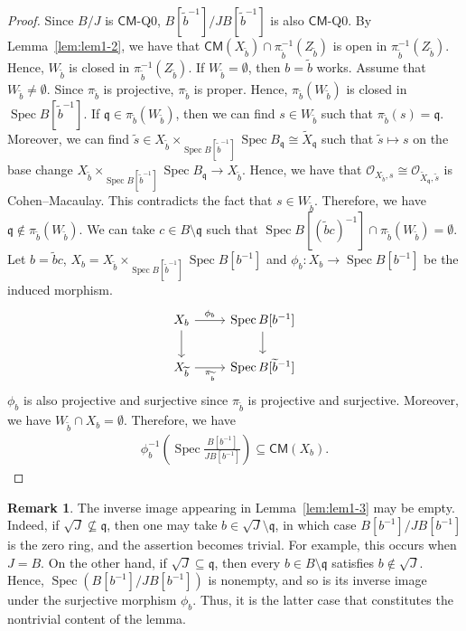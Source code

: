 \documentclass[a4paper, 11pt]{amsart}
\theoremstyle{definition}
\newtheorem{remark}[theorem]{Remark}
\newcommand{\Spec}{\operatorname{Spec}}
\let\subset\subseteq
\renewcommand{\tilde}[1]{\widetilde{#1}}
\begin{document}
\begin{proof}
    Since $B/J$ is $\mathsf{CM}$-Q0, $B[\tilde{b}^{-1}]/JB[\tilde{b}^{-1}]$ is also $\mathsf{CM}$-Q0. By Lemma~\ref{lem:lem1-2}, we have that $\mathsf{CM}(X_{\tilde{b}}) \cap \pi_{\tilde{b}}^{-1}(Z_{\tilde{b}})$ is open in $\pi_{\tilde{b}}^{-1}(Z_{\tilde{b}})$. Hence, $W_{\tilde{b}}$ is closed in $\pi_{\tilde{b}}^{-1}(Z_{\tilde{b}})$. If $W_{\tilde{b}} = \emptyset$, then $b = \tilde{b}$ works. Assume that $W_{\tilde{b}} \neq \emptyset$. Since $\pi_{\tilde{b}}$ is projective, $\pi_{\tilde{b}}$ is proper. Hence, $\pi_{\tilde{b}}(W_{\tilde{b}})$ is closed in $\Spec B[\tilde{b}^{-1}]$. If $\mathfrak{q} \in \pi_{\tilde{b}}(W_{\tilde{b}})$, then we can find $s \in W_{\tilde{b}}$ such that $\pi_{\tilde{b}}(s) = \mathfrak{q}$. Moreover, we can find $\tilde{s} \in X_{\tilde{b}} \times_{\Spec B[\tilde{b}^{-1}]} \Spec B_\mathfrak{q} \cong \tilde{X}_\mathfrak{q}$ such that $\tilde{s} \mapsto s$ on the base change $X_{\tilde{b}} \times_{\Spec B[\tilde{b}^{-1}]} \Spec B_\mathfrak{q} \to X_{\tilde{b}}$. Hence, we have that $\mathcal{O}_{X_{\tilde{b}}, s} \cong \mathcal{O}_{\tilde{X}_\mathfrak{q}, \tilde{s}}$ is Cohen--Macaulay. This contradicts the fact that $s \in W_{\tilde{b}}$. Therefore, we have $\mathfrak{q} \notin \pi_{\tilde{b}}(W_{\tilde{b}})$. We can take $c \in B \setminus \mathfrak{q}$ such that $\Spec B[(\tilde{b}c)^{-1}] \cap \pi_{\tilde{b}}(W_{\tilde{b}}) = \emptyset$. Let $b = \tilde{b}c$, $X_b = X_{\tilde{b}} \times_{\Spec B[\tilde{b}^{-1}]} \Spec B[b^{-1}]$ and $\phi_b \colon X_b \to \Spec B[b^{-1}]$ be the induced morphism. 
    \[\begin{tikzcd}
        {X_b} & {\Spec B[b^{-1}]} \\
        {X_{\tilde{b}}} & {\Spec B[\tilde{b}^{-1}]}
        \arrow["{\phi_b}", from=1-1, to=1-2]
        \arrow[from=1-1, to=2-1]
        \arrow[from=1-2, to=2-2]
        \arrow["{\pi_{\tilde{b}}}"', from=2-1, to=2-2]
    \end{tikzcd}\]
    $\phi_b$ is also projective and surjective since $\pi_{\tilde{b}}$ is projective and surjective. Moreover, we have $W_{\tilde{b}} \cap X_b = \emptyset$. Therefore, we have
    \begin{align*}
        \phi_b^{-1}\left( \Spec \frac{B[b^{-1}]}{JB[b^{-1}]} \right) \subset \mathsf{CM}(X_b).
    \end{align*}
\end{proof}

\begin{remark}\label{rem:empty}
    The inverse image appearing in Lemma~\ref{lem:lem1-3} may be empty. Indeed, if $\sqrt{J}\not\subseteq\mathfrak q$, then one may take $b\in\sqrt{J}\setminus\mathfrak q$, in which case $B[b^{-1}]/JB[b^{-1}]$ is the zero ring, and the assertion becomes trivial. For example, this occurs when $J=B$. On the other hand, if $\sqrt{J}\subseteq\mathfrak q$, then every $b\in B\setminus\mathfrak q$ satisfies $b\notin\sqrt{J}$. Hence, $\operatorname{Spec}(B[b^{-1}]/JB[b^{-1}])$ is nonempty, and so is its inverse image under the surjective morphism $\phi_b$. Thus, it is the latter case that constitutes the nontrivial content of the lemma.
\end{remark}
\end{document}
